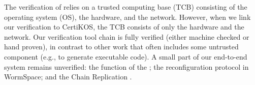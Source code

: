 The verification of \sysname{} relies on a trusted computing base (TCB) consisting of the operating system (OS), the hardware, and the network.
However, when we link our verification to CertiKOS, the TCB consists of only the hardware and the network.
Our verification tool chain is fully verified (either machine checked or hand proven), in contrast to other work that often includes some untrusted component (e.g., to generate executable code). %
A small part of our end-to-end system remains unverified: the  function of the \WOS{}; the reconfiguration protocol in WormSpace; and the Chain Replication \WOR{}.





